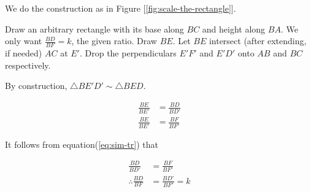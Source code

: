 \documentclass[11pt]{article}
\theoremstyle{definition}
\theoremstyle{plain}
\theoremstyle{problemstyle}
\theoremstyle{remark}
\theoremstyle{definition}
\begin{document}
We do the construction as in Figure [\ref{fig:scale-the-rectangle}].

Draw an arbitrary rectangle with its base along $BC$ and height along $BA$. We only want $\frac{BD}{BF}=k$, the given ratio. Draw $BE$. Let $BE$ intersect (after extending, if needed) $AC$ at $E'$. Drop the perpendiculars $E'F'$ and $E'D'$ onto $AB$ and $BC$ respectively.

By construction, $\triangle BE'D'\sim\triangle BED$. 

\begin{equation}
\begin{aligned}
    \frac{BE}{BE'}&=\frac{BD}{BD'} \\
    \frac{BE}{BE'}&=\frac{BF}{BF'}
\end{aligned}\label{eq:sim-tr}
\end{equation}

It follows from equation(\ref{eq:sim-tr}) that 

\begin{equation*}
\begin{aligned}
    \frac{BD}{BD'}&=\frac{BF}{BF'}\\
    \therefore \frac{BD}{BF}&=\frac{BD'}{BF'}=k
\end{aligned}
\end{equation*}
\end{document}
